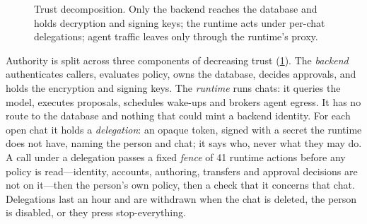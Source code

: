 \documentclass[10pt,twocolumn,a4paper]{article}
\begin{document}
\begin{figure}[t]
\centering
{}
\caption{Trust decomposition. Only the backend reaches the database and
holds decryption and signing keys; the runtime acts under per-chat
delegations; agent traffic leaves only through the runtime's proxy.}
\label{fig:arch}
\end{figure}

Authority is split across three components of decreasing trust
(\cref{fig:arch}). The \emph{backend} authenticates callers, evaluates
policy, owns the database, decides approvals, and holds the encryption
and signing keys. The \emph{runtime} runs chats: it queries the model,
executes proposals, schedules wake-ups and brokers agent egress. It has
no route to the database and nothing that could mint a backend
identity. For each open chat it holds a \emph{delegation}: an opaque
token, signed with a secret the runtime does not have, naming the
person and chat; it says who, never what they may do. A call under a
delegation passes a fixed \emph{fence} of 41 runtime actions before any
policy is read---identity, accounts, authoring, transfers and approval
decisions are not on it---then the person's own policy, then a check
that it concerns that chat. Delegations last an hour and are withdrawn
when the chat is deleted, the person is disabled, or they press
stop-everything.
\end{document}
